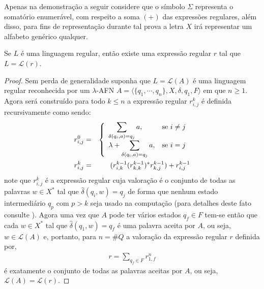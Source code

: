 \begin{remark}
	Apenas na demonstração a seguir considere que o símbolo $\Sigma$ representa o somatório enumerável, com respeito a soma $(+)$ das expressões regulares, além disso, para fins de representação durante tal prova a letra $X$ irá representar um alfabeto genérico qualquer.
\end{remark}

\begin{theorem}
	Se $L$ é uma linguagem regular, então existe uma expressão regular $r$ tal que $L = \mathcal{L}(r)$.
\end{theorem}

\begin{proof}
	Sem perda de generalidade suponha que $L = \mathcal{L}(A)$ é uma linguagem regular reconhecida por um $\lambda$-AFN $A = \langle \{q_1, \cdots, q_n\}, X, \delta, q_1, F \rangle$ em que $n \geq 1$. Agora será construído para todo $k \leq n$ a expressão regular $r^k_{i,j}$ é definida recursivamente como sendo:
	\begin{eqnarray*}
		r^0_{i,j} & = &  \left\{
		\begin{array}{ll}	
			\displaystyle\sum_{\delta(q_i, a) =  q_j} a, & \hbox{se } i \neq j\\
			\displaystyle\lambda + \sum_{\delta(q_i, a) =  q_j} a, & \hbox{se } i = j\\
		\end{array}\right.\\
		r^{k}_{i,j} & = & (r^{k-1}_{i,k}(r^{k-1}_{k,k})^* r^{k-1}_{k,j}) + r^{k-1}_{i,j}
	\end{eqnarray*}
	note que $r^{k}_{i,j}$ é a expressão regular cuja valoração é o conjunto de todas as palavras $w \in X^*$ tal que $\widehat{\delta}(q_i, w) = q_j$ de forma que nenhum estado intermediário $q_p$ com $p > k$ seja usado na computação (para detalhes deste fato consulte \cite{benjaLivro2010, hopcroft2008}). Agora uma vez que $A$ pode ter vários estados $q_f \in F$ tem-se então que cada $w \in X^*$ tal que $\widehat{\delta}(q_1, w) = q_f$ é uma palavra aceita por $A$, ou seja, $w \in \mathcal{L}(A)$ e, portanto, para $n = \# Q$ a valoração da expressão regular $r$ definida por, 
	\begin{eqnarray*}
		r = \sum_{q_f \in F} r^n_{1, f}
	\end{eqnarray*}
	é exatamente o conjunto de todas as palavras aceitas por $A$, ou seja, $\mathcal{L}(A) = \mathcal{L}(r)$. 
\end{proof}

